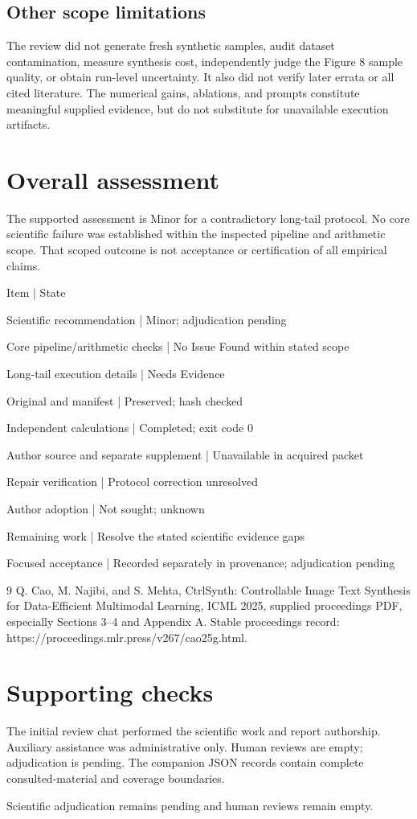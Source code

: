 \documentclass[10pt]{article}
\begin{document}
\subsection*{Other scope limitations}
The review did not generate fresh synthetic samples, audit dataset contamination, measure synthesis cost, independently judge the Figure 8 sample quality, or obtain run-level uncertainty. It also did not verify later errata or all cited literature. The numerical gains, ablations, and prompts constitute meaningful supplied evidence, but do not substitute for unavailable execution artifacts.\par
\section*{Overall assessment}
The supported assessment is Minor for a contradictory long-tail protocol. No core scientific failure was established within the inspected pipeline and arithmetic scope. That scoped outcome is not acceptance or certification of all empirical claims.\par
Item | State\par
Scientific recommendation | Minor; adjudication pending\par
Core pipeline/arithmetic checks | No Issue Found within stated scope\par
Long-tail execution details | Needs Evidence\par
Original and manifest | Preserved; hash checked\par
Independent calculations | Completed; exit code 0\par
Author source and separate supplement | Unavailable in acquired packet\par
Repair verification | Protocol correction unresolved\par
Author adoption | Not sought; unknown\par
Remaining work | Resolve the stated scientific evidence gaps\par
Focused acceptance | Recorded separately in provenance; adjudication pending\par
9 Q. Cao, M. Najibi, and S. Mehta, CtrlSynth: Controllable Image Text Synthesis for Data-Efficient Multimodal Learning, ICML 2025, supplied proceedings PDF, especially Sections 3–4 and Appendix A. Stable proceedings record: https://proceedings.mlr.press/v267/cao25g.html.\par
\section*{Supporting checks}
The initial review chat performed the scientific work and report authorship. Auxiliary assistance was administrative only. Human reviews are empty; adjudication is pending. The companion JSON records contain complete consulted-material and coverage boundaries.\par
Scientific adjudication remains pending and human reviews remain empty.\par
\end{document}
